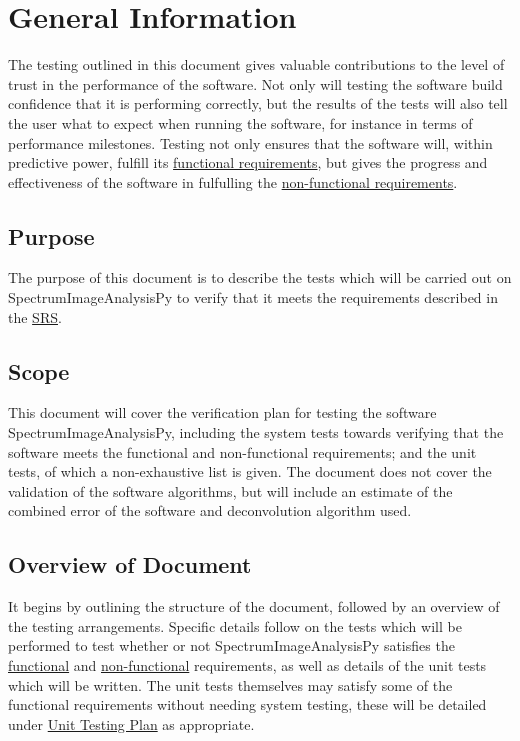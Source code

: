 \documentclass[12pt, titlepage]{article}
\newcommand{\progname}{SpectrumImageAnalysisPy}
\begin{document}
\section{General Information}
The testing outlined in this document gives valuable contributions to the level
of trust in the performance of the software. Not only will testing the software
build confidence that it is performing correctly, but the results of the tests
will also tell the user what to expect when running the software, for instance
in terms of performance milestones. Testing not only ensures that the software
will, within predictive power, fulfill its \hyperref[subsec:FR]{functional
requirements}, but gives the progress and effectiveness of the software in
fulfulling the \hyperref[subsec:NfR]{non-functional
  requirements}. 

\subsection{Purpose}
The purpose of this document is to describe the tests which will be carried out
on \progname{} to verify that it meets the requirements described in the
\hyperref[doc:SRS]{SRS}.


\subsection{Scope}
This document will cover the verification plan for testing the software
\progname{}, including the system tests towards verifying that the software
meets the functional and non-functional requirements; and the unit tests, of
which a non-exhaustive list is given. The document does not cover the validation
of the software algorithms, but will include an estimate of the combined error
of the software and deconvolution algorithm used. 

\subsection{Overview of Document}
 It begins by outlining the structure of the document, followed by an overview
of the testing arrangements. Specific details follow on the tests which will be
performed to test whether or not \progname{} satisfies the
\hyperref[subsec:FuncReqTest]{functional} and
\hyperref[subsec:NonfuncReqTest]{non-functional} requirements, as well as
details of the unit tests which will be written. The unit tests themselves may
satisfy some of the functional requirements without needing system testing,
these will be detailed under \hyperref[sec:UnitTest]{Unit Testing Plan} as
appropriate.
\end{document}
